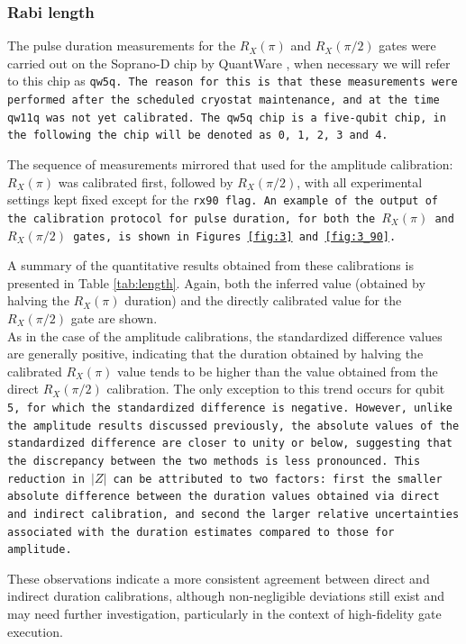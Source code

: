 \subsubsection{Rabi length}
The pulse duration measurements for the $R_X(\pi)$ and $R_X(\pi/2)$ gates were carried out on the Soprano-D chip by QuantWare \cite{qw5q}, when necessary we will refer to this chip as \tt{qw5q}.
The reason for this is that these measurements were performed after the scheduled cryostat maintenance, and at the time \tt{qw11q} was not yet calibrated.
The \tt{qw5q} chip is a five-qubit chip, in the following the chip will be denoted as \tt{0}, \tt{1}, \tt{2}, \tt{3} and \tt{4}.

The sequence of measurements mirrored that used for the amplitude calibration: $R_X(\pi)$ was calibrated first, followed by $R_X(\pi/2)$, with all experimental settings kept fixed except for the \tt{rx90} flag.
An example of the output of the calibration protocol for pulse duration, for both the $R_X(\pi)$ and $R_X(\pi/2)$ gates, is shown in Figures \ref{fig:3} and \ref{fig:3_90}. 

A summary of the quantitative results obtained from these calibrations is presented in Table \ref{tab:length}.
Again, both the inferred value (obtained by halving the $R_X(\pi)$ duration) and the directly calibrated value for the $R_X(\pi/2)$ gate are shown.\\
As in the case of the amplitude calibrations, the standardized difference values are generally positive, indicating that the duration obtained by halving the calibrated $R_X(\pi)$ value tends to be higher than the value obtained from the direct $R_X(\pi/2)$ calibration. 
The only exception to this trend occurs for qubit \tt{5}, for which the standardized difference is negative.
However, unlike the amplitude results discussed previously, the absolute values of the standardized difference are closer to unity or below, suggesting that the discrepancy between the two methods is less pronounced.
This reduction in $|Z|$ can be attributed to two factors: first the smaller absolute difference between the duration values obtained via direct and indirect calibration, and second the larger relative uncertainties associated with the duration estimates compared to those for amplitude.

These observations indicate a more consistent agreement between direct and indirect duration calibrations, although non-negligible deviations still exist and may need further investigation, particularly in the context of high-fidelity gate execution.

